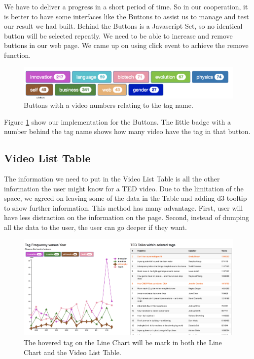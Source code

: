 \documentclass{report}
\numberwithin{figure}{section}
\begin{document}
\quad We have to deliver a progress in a short period of time. So in our cooperation, it is better to have some interfaces like the Buttons to assist us to manage and test our result we had built. Behind the Buttons is a Javascript Set, so no identical button will be selected repeatly. We need to be able to increase and remove buttons in our web page. We came up on using click event to achieve the remove function.

\begin{figure}
\begin{center}
\includegraphics[scale=0.6]{buttons}
\caption{Buttons with a video numbers relating to the tag name.}
\label{fig:buttons}
\end{center}
\end{figure}

Figure \ref{fig:buttons} show our implementation for the Buttons. The little badge with a number behind the tag name shows how many video have the tag in that button.




\subsection{Video List Table}
\quad The information we need to put in the Video List Table is all the other information the user might know for a TED video. Due to the limitation of the space, we agreed on leaving some of the data in the Table and adding d3 tooltip to show further information. This method has many advantage. First, user will have less distraction on the information on the page. Second, instead of dumping all the data to the user, the user can go deeper if they want.

\begin{figure}
\begin{center}
\includegraphics[scale=0.3]{changecolor}
\caption{The hovered tag on the Line Chart will be mark in both the Line Chart and the Video List Table.}
\label{fig:changecolor}
\end{center}
\end{figure} 
\end{document}

